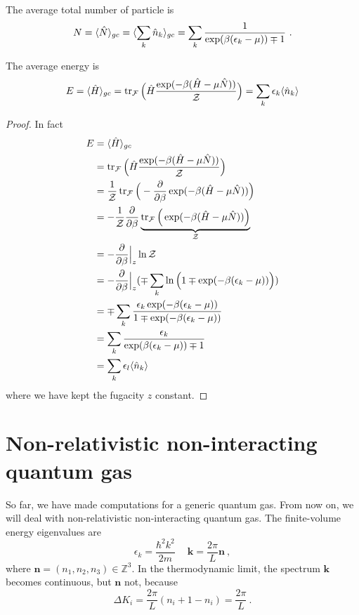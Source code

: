     The average total number of particle is 
    \begin{equation*}
        N = \langle\hat N\rangle_{gc} = \langle\sum_k \hat n_k\rangle_{gc} = \sum_k \frac{1}{\exp(\beta(\epsilon_k - \mu))\mp 1} ~.
    \end{equation*}

    The average energy is 
    \begin{equation*}
        E = \langle\hat H\rangle_{gc} = \operatorname{tr}_{\mathcal F} \Big (\hat H \frac{\exp (-\beta (\hat H - \mu \hat N))}{\mathcal Z} \Big) = \sum_k \epsilon_k \langle\hat n_k\rangle
    \end{equation*}
    \begin{proof}
        In fact 
        \begin{equation*}
        \begin{aligned}
            E & = \langle\hat H\rangle_{gc} \\ & = \operatorname{tr}_{\mathcal F} \Big (\hat H \frac{\exp (-\beta (\hat H - \mu \hat N))}{\mathcal Z} \Big) \\ & = \frac{1}{\mathcal Z} \operatorname{tr}_{\mathcal F} \Big (- \frac{\partial}{\partial\beta} \exp (-\beta (\hat H - \mu \hat N)) \Big) \\ & = - \frac{1}{\mathcal Z} \frac{\partial}{\partial\beta}\underbrace{ \operatorname{tr}_{\mathcal F} \Big (\exp (-\beta (\hat H - \mu \hat N)) \Big)}_{\mathcal Z} \\ & = - \frac{\partial}{\partial\beta} \Big \vert_z \ln \mathcal Z \\ & =  - \frac{\partial}{\partial\beta} \Big \vert_z (\mp \sum_k \ln \Big (1 \mp \exp (-\beta (\epsilon_k - \mu)) \Big)) \\ & = \mp \sum_k \frac{\epsilon_k \exp (-\beta (\epsilon_k - \mu))}{1 \mp \exp (-\beta (\epsilon_k - \mu))} \\ & = \sum_k \frac{\epsilon_k}{\exp (\beta (\epsilon_k - \mu)) \mp 1} \\ & = \sum_k \epsilon_l \langle\hat n_k\rangle
        \end{aligned}
        \end{equation*}
        where we have kept the fugacity $z$ constant.
    \end{proof}

\section{Non-relativistic non-interacting quantum gas}

    So far, we have made computations for a generic quantum gas. From now on, we will deal with non-relativistic non-interacting quantum gas. The finite-volume energy eigenvalues are 
    \begin{equation*}
        \epsilon_k = \frac{\hbar^2 k^2}{2m} ~ \quad \mathbf k = \frac{2\pi}{L} \mathbf n ~,
    \end{equation*}
    where $\mathbf n = (n_1, n_2, n_3) \in \mathbb Z^3$. In the thermodynamic limit, the spectrum $\mathbf k$ becomes continuous, but $\mathbf n$ not, because
    \begin{equation*}
        \Delta K_i = \frac{2\pi}{L} (n_i + 1 - n_i) = \frac{2\pi}{L} ~.
    \end{equation*}

